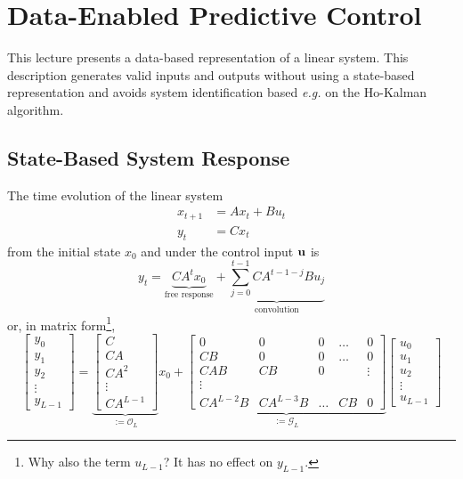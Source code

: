 \chapter{Data-Enabled Predictive Control}
\label{sec:deepc}

This lecture presents a data-based representation of a linear system. This description generates valid inputs and outputs without using a state-based representation and avoids system identification based \textit{e.g.} on the Ho-Kalman algorithm.

\section{State-Based System Response}
\label{sec:deepc-state-based-response}

The time evolution of the linear system
\begin{equation*}
  \begin{aligned}
    x_{t+1} &= Ax_t + Bu_t \\
    y_t &= Cx_t
  \end{aligned}
\end{equation*}
from the initial state $x_0$ and under the control input $\boldsymbol{\mathrm{u}}$ is
\begin{equation}
  \label{eq:time-evolution-free-response-convolution}
  y_t = \underbrace{CA^tx_0}_{\text{free response}} + \underbrace{\sum_{j=0}^{t-1}CA^{t-1-j}Bu_j}_{\text{convolution}}
\end{equation}
or, in matrix form\footnote{Why also the term $u_{L-1}$? It has no effect on $y_{L-1}$.},
\begin{equation}
  \label{eq:time-evolution-free-response-convolution-matrix}
  \begin{bmatrix}
    y_0 \\ y_1 \\ y_2 \\ \vdots \\ y_{L-1}
  \end{bmatrix} = \underbrace{
    \begin{bmatrix}
      C \\ CA \\ CA^2 \\ \vdots \\ CA^{L-1}
    \end{bmatrix}
  }_{:=\mathcal{O}_L} x_0 + \underbrace{
  \begin{bmatrix}
    0 & 0 & 0 & \ldots & 0 \\
    CB & 0 & 0 & \ldots & 0 \\
    CAB & CB & 0 & & \vdots \\
    \vdots \\
    CA^{L-2}B & CA^{L-3}B & \ldots & CB & 0
  \end{bmatrix}}_{:=\mathcal{G}_L}
\begin{bmatrix}
  u_0 \\ u_1 \\ u_2 \\ \vdots \\ u_{L-1}
  \end{bmatrix}
\end{equation}
